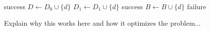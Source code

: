 \documentclass[12pt]{article}
\numberwithin{equation}{section}
\begin{document}
\begin{algorithmic}
		\State \Return success
	\EndIf
			\State $D\gets D_0\cup\{d\}$
				\State $D_1\gets D_1\cup\{d\}$
				\State \Return success
			\Else
				\State $B\gets B\cup\{d\}$
			\EndIf
		\EndIf
	\EndFor
	\State \Return failure
\EndFunction
\end{algorithmic}

Explain why this works here and how it optimizes the problem...
\end{document}
